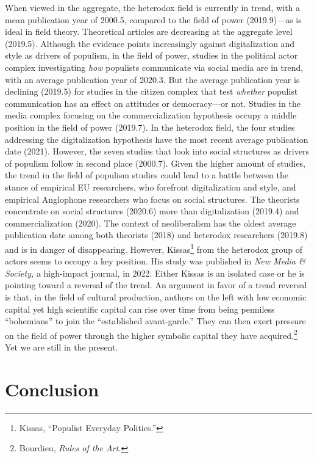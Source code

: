 \documentclass{tufte-handout}
\begin{document}
{{{{When viewed in the aggregate, the heterodox field is currently in trend,
with a mean publication year of 2000.5, compared to the field of power
(2019.9)---as is ideal in field theory. Theoretical articles are
decreasing at the aggregate level (2019.5). Although the evidence points
increasingly against digitalization and style as drivers of populism, in
the field of power, studies in the political actor complex investigating
\emph{how} populists communicate via social media are in trend, with an
average publication year of 2020.3. But the average publication year is
declining (2019.5) for studies in the citizen complex that test
\emph{whether} populist communication has an effect on attitudes or
democracy---or not. Studies in the media complex focusing on the
commercialization hypothesis occupy a middle position in the field of
power (2019.7). In the heterodox field, the four studies addressing the
digitalization hypothesis have the most recent average publication date
(2021). However, the seven studies that look into social structures as
drivers of populism follow in second place (2000.7). Given the higher
amount of studies, the trend in the field of populism studies could lead
to a battle between the stance of empirical EU researchers, who
forefront digitalization and style, and empirical Anglophone researchers
who focus on social structures. The theorists concentrate on social
structures (2020.6) more than digitalization (2019.4) and
commercialization (2020). The context of neoliberalism has the oldest
average publication date among both theorists (2018) and heterodox
researchers (2019.8) and is in danger of disappearing. However,
Kissas\footnote{Kissas, ``Populist Everyday Politics.''} from the
heterodox group of actors seems to occupy a key position. His study was
published in \emph{New Media \& Society,} a high-impact journal, in
2022. Either Kissas is an isolated case or he is pointing toward a
reversal of the trend. An argument in favor of a trend reversal is that,
in the field of cultural production, authors on the left with low
economic capital yet high scientific capital can rise over time from
being penniless ``bohemians'' to join the ``established avant-garde.''
They can then exert pressure on the field of power through the higher
symbolic capital they have acquired.\footnote{Bourdieu, \emph{Rules of
  the Art.}} Yet we are still in the present.

\hypertarget{conclusion}{%
\section{Conclusion}\label{conclusion}}

}}}}
\end{document}
